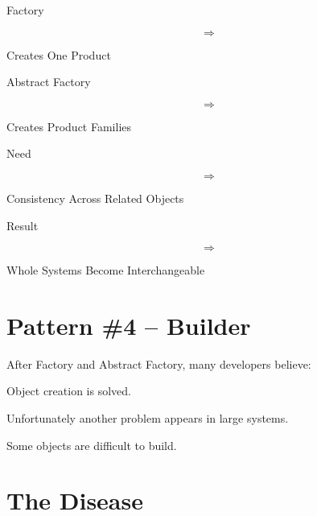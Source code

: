 \documentclass[11pt,a4paper]{book}
\begin{document}
\begin{compressionbox}

Factory

\[
\Rightarrow
\]

Creates One Product

\vspace{0.5em}

Abstract Factory

\[
\Rightarrow
\]

Creates Product Families

\vspace{0.5em}

Need

\[
\Rightarrow
\]

Consistency Across Related
Objects

\vspace{0.5em}

Result

\[
\Rightarrow
\]

Whole Systems Become
Interchangeable

\end{compressionbox}
\section{Pattern \#4 -- Builder}

After Factory and Abstract Factory,
many developers believe:


Object creation is solved.


Unfortunately another problem
appears in large systems.


Some objects are difficult to build.


\section{The Disease}
\end{document}
